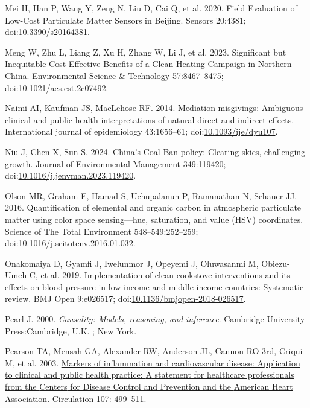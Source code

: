 \documentclass[
  letterpaper,
  DIV=11,
  numbers=noendperiod]{scrartcl}
\newlength{\cslhangindent}
\newenvironment{CSLReferences}[2] %
 {\begin{list}{}{%
  \setlength{\itemindent}{0pt}
  \setlength{\leftmargin}{0pt}
  \setlength{\parsep}{0pt}
  \ifodd #1
   \setlength{\leftmargin}{\cslhangindent}
   \setlength{\itemindent}{-1\cslhangindent}
  \fi
  \setlength{\itemsep}{#2\baselineskip}}}
 {\end{list}}
\begin{document}
\begin{CSLReferences}{1}{1}
Mei H, Han P, Wang Y, Zeng N, Liu D, Cai Q, et al. 2020. Field
{Evaluation} of {Low-Cost Particulate Matter Sensors} in {Beijing}.
Sensors 20:4381;
doi:\href{https://doi.org/10.3390/s20164381}{10.3390/s20164381}.

Meng W, Zhu L, Liang Z, Xu H, Zhang W, Li J, et al. 2023. Significant
but {Inequitable Cost-Effective Benefits} of a {Clean Heating Campaign}
in {Northern China}. Environmental Science \& Technology 57:8467--8475;
doi:\href{https://doi.org/10.1021/acs.est.2c07492}{10.1021/acs.est.2c07492}.

Naimi AI, Kaufman JS, MacLehose RF. 2014. Mediation misgivings:
Ambiguous clinical and public health interpretations of natural direct
and indirect effects. International journal of epidemiology 43:1656--61;
doi:\href{https://doi.org/10.1093/ije/dyu107}{10.1093/ije/dyu107}.

Niu J, Chen X, Sun S. 2024. China's {Coal Ban} policy: {Clearing} skies,
challenging growth. Journal of Environmental Management 349:119420;
doi:\href{https://doi.org/10.1016/j.jenvman.2023.119420}{10.1016/j.jenvman.2023.119420}.

Olson MR, Graham E, Hamad S, Uchupalanun P, Ramanathan N, Schauer JJ.
2016. Quantification of elemental and organic carbon in atmospheric
particulate matter using color space sensing---hue, saturation, and
value ({HSV}) coordinates. Science of The Total Environment
548--549:252--259;
doi:\href{https://doi.org/10.1016/j.scitotenv.2016.01.032}{10.1016/j.scitotenv.2016.01.032}.

Onakomaiya D, Gyamfi J, Iwelunmor J, Opeyemi J, Oluwasanmi M,
Obiezu-Umeh C, et al. 2019. Implementation of clean cookstove
interventions and its effects on blood pressure in low-income and
middle-income countries: Systematic review. BMJ Open 9:e026517;
doi:\href{https://doi.org/10.1136/bmjopen-2018-026517}{10.1136/bmjopen-2018-026517}.

Pearl J. 2000. \emph{Causality: Models, reasoning, and inference}.
Cambridge University Press:Cambridge, U.K. ; New York.

Pearson TA, Mensah GA, Alexander RW, Anderson JL, Cannon RO 3rd, Criqui
M, et al. 2003.
\href{https://www.ncbi.nlm.nih.gov/pubmed/12551878}{Markers of
inflammation and cardiovascular disease: Application to clinical and
public health practice: {A} statement for healthcare professionals from
the {Centers} for {Disease Control} and {Prevention} and the {American
Heart Association}}. Circulation 107: 499--511.


\end{CSLReferences}
\end{document}
